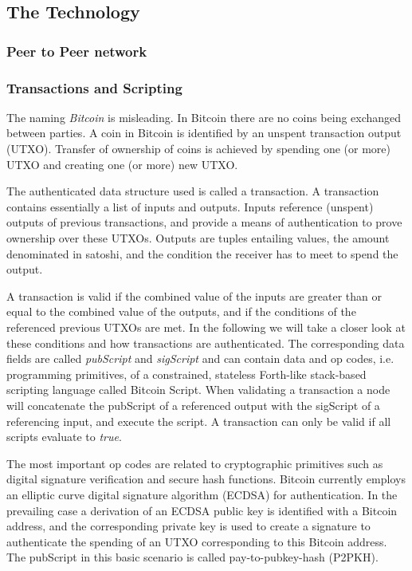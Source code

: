 \subsection{The Technology}
\label{sec:btc_tech}

\subsubsection{Peer to Peer network}
\label{sec:p2p}

\cite{DonetDonet2014}


\subsubsection{Transactions and Scripting}
\label{sec:tx}

The naming \emph{Bitcoin} is misleading. In Bitcoin there are no coins being exchanged between parties. A coin in Bitcoin is identified by an unspent transaction output (UTXO). Transfer of ownership of coins is achieved by spending one (or more) UTXO and creating one (or more) new UTXO. 

The authenticated data structure used is called a transaction. A transaction contains essentially a list of inputs and outputs. Inputs reference (unspent) outputs of previous transactions, and provide a means of authentication to prove ownership over these UTXOs. Outputs are tuples entailing values, the amount denominated in satoshi, and the condition the receiver has to meet to spend the output. 

A transaction is valid if the combined value of the inputs are greater than or equal to the combined value of the outputs, and if the conditions of the referenced previous UTXOs are met.
In the following we will take a closer look at these conditions and how transactions are authenticated. The corresponding data fields are called \emph{pubScript} and \emph{sigScript} and can contain data and op codes, i.e. programming primitives, of a constrained, stateless Forth-like stack-based scripting language called Bitcoin Script. 
When validating a transaction a node will concatenate the pubScript of a referenced output with the sigScript of a referencing input, and execute the script. A transaction can only be valid if all  scripts evaluate to \emph{true}. 

The most important op codes are related to cryptographic primitives such as digital signature verification and secure hash functions. Bitcoin currently employs an elliptic curve digital signature algorithm (ECDSA) for authentication. In the prevailing case a derivation of an ECDSA public key is identified with a Bitcoin address, and the corresponding private key is used to create a signature to authenticate the spending of an UTXO corresponding to this Bitcoin address. 
The pubScript in this basic scenario is called pay-to-pubkey-hash (P2PKH).

